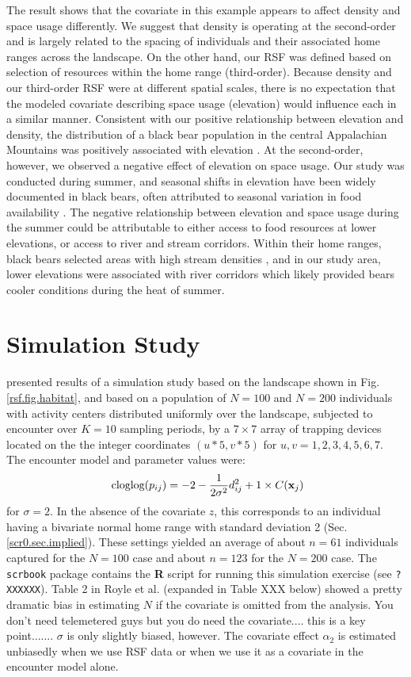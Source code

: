 The result shows that 
the covariate in this example appears to affect
 density and space usage
differently.  We suggest that density is operating at the second-order
and is largely related to the spacing of individuals and their
associated home ranges across the landscape.  On the other hand, our RSF was defined
based on selection of resources within the home range (third-order).
Because density and our third-order RSF were at different spatial
scales, there is no expectation that the modeled covariate describing
space usage (elevation) would influence each in a similar manner.
Consistent with our positive relationship between elevation and
density, the distribution of a black bear population in the central
Appalachian Mountains was positively associated with elevation \citep{frary_etal:2011}.
 At the second-order, however, we observed a negative
effect of elevation on space usage.  Our study was conducted during
summer, and seasonal shifts in elevation have been widely documented
in black bears, often attributed to seasonal variation in food
availability \citep{reynolds_beecham:1980,
graber_white:1983}.
 The negative relationship between elevation and space
usage during the summer could be attributable to either access to food
resources at lower elevations, or access to river and stream
corridors.  Within their home ranges, black bears selected areas with
high stream densities \citep{fecske_etal:2002}, and in our study area,
lower elevations were associated with river corridors which likely
provided bears cooler conditions during the heat of summer.



\section{Simulation Study}

\citet{royle_etal:2012mee} presented results of a simulation study
based on the landscape shown in Fig. \ref{rsf.fig.habitat}, and based
on a population of $N=100$ and $N=200$ individuals with activity
centers distributed uniformly over the landscape, subjected to
encounter over $K=10$ sampling periods, by a $7 \times 7$ array of
trapping devices located on the the integer coordinates $(u*5,v*5)$
for $u,v = 1,2,3,4,5,6,7$. The encounter model and parameter values
were:
\[
\mbox{ cloglog}(p_{ij}) = -2  -\frac{1}{2\sigma^{2}} d_{ij}^{2} + 1 \times C({\bf x}_{j})
\]
for $\sigma =2$. In the absence of the covariate $z$, this corresponds
to an individual having a bivariate normal home range with standard
deviation 2 (Sec. \ref{scr0.sec.implied}).
These settings yielded an average of about $n=61$ individuals captured for
the $N=100$ case and about $n=123$ for the $N=200$ case. The \mbox{\tt
  scrbook} package contains the {\bf R} script for running this
simulation exercise (see \mbox{\tt ? XXXXXX}). Table 2 in Royle et
al. (expanded in Table XXX below) showed a pretty dramatic bias in estimating $N$ if the covariate
is omitted from the analysis. You don't need telemetered guys but you
do need the covariate.... this is a key point.......  $\sigma$ is only
slightly biased, however. The covariate effect $\alpha_{2}$ is
estimated unbiasedly when we use RSF data or when we use it as a
covariate in the encounter model alone. 

